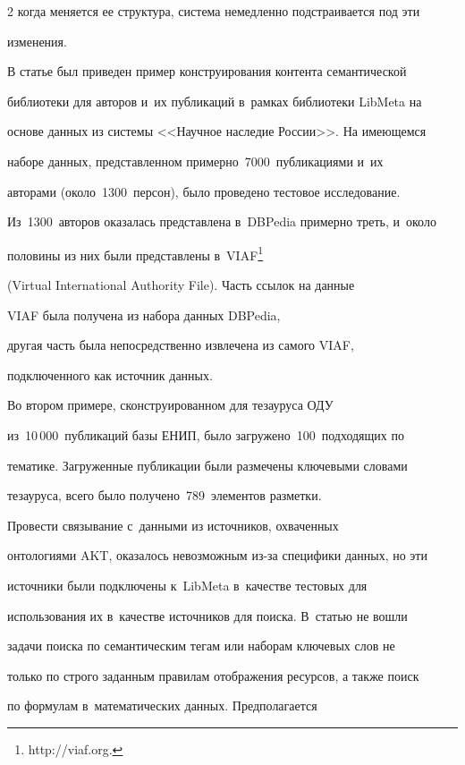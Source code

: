 \begin{multicols}{2}
когда меняется ее структура, система немедленно подстраивается под эти 

изменения.

    

    В статье был приведен пример конструирования контента семантической 

библиотеки для авторов и~их публикаций в~рамках библиотеки LibMeta на 

основе данных из системы <<Научное наследие России>>. На имеющемся 

наборе данных, пред\-став\-лен\-ном примерно~7000~публикациями и~их 

авторами (около~1300~персон), было проведено тестовое исследование. 

Из~1300~авторов оказалась пред\-став\-ле\-на в~DBPedia примерно треть, и~около 

половины из них были представлены в~VIAF\footnote{{\sf http://viaf.org.}}

(Virtual International Authority File). Часть ссылок на данные 

VIAF была получена из набора данных DBPedia, 

другая часть была непосредственно извлечена из самого VIAF, 

подключенного как источник данных. 

    

    Во втором примере, сконструированном для тезауруса ОДУ 

из~10\,000~публикаций базы ЕНИП, было загружено~100~подходящих по 

тематике. Загруженные публикации были размечены ключевыми словами 

тезауруса, всего было получено~789~элементов разметки.

    

    Провести связывание с~данными из источников, охваченных 

онтологиями AKT, оказалось невозможным из-за специфики данных, но эти 

источники были подключены к~LibMeta в~качестве тестовых для 

использования их в~качестве источников для поиска. В~статью не вошли 

задачи поиска по семантическим тегам или наборам ключевых слов не 

только по строго заданным правилам отоб\-ра\-же\-ния ресурсов, а также поиск 

по формулам в~математических данных. Предполагается 


\end{multicols}
